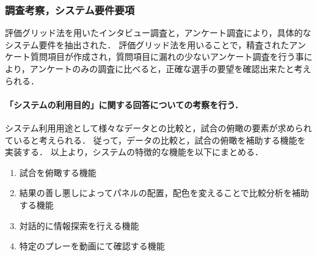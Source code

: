 \documentclass[sotsuron]{kuee}
\begin{document}
			\subsubsection{調査考察，システム要件要項}
				評価グリッド法を用いたインタビュー調査と，アンケート調査により，具体的なシステム要件を抽出された．
				評価グリッド法を用いることで，精査されたアンケート質問項目が作成され，質問項目に漏れの少ないアンケート調査を行う事により，アンケートのみの調査に比べると，正確な選手の要望を確認出来たと考えられる．
					\paragraph {「システムの利用目的」に関する回答についての考察を行う．}
						システム利用用途として様々なデータとの比較と，試合の俯瞰の要素が求められていると考えられる．
						従って，データの比較と，試合の俯瞰を補助する機能を実装する．
						以上より，システムの特徴的な機能を以下にまとめる．
						\begin{enumerate}	
							\item 試合を俯瞰する機能
							\item 結果の善し悪しによってパネルの配置，配色を変えることで比較分析を補助する機能
							\item 対話的に情報探索を行える機能
							\item 特定のプレーを動画にて確認する機能
						\end{enumerate}
\end{document}
